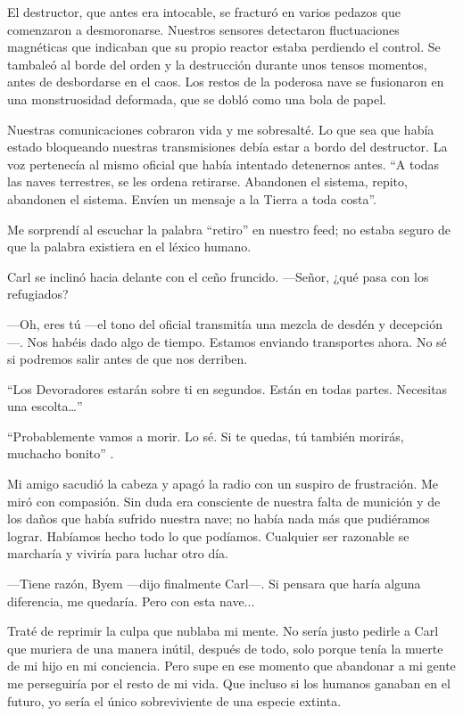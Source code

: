 El destructor, que antes era intocable, se fracturó en varios pedazos que comenzaron a desmoronarse. Nuestros sensores detectaron fluctuaciones magnéticas que indicaban que su propio reactor estaba perdiendo el control. Se tambaleó al borde del orden y la destrucción durante unos tensos momentos, antes de desbordarse en el caos. Los restos de la poderosa nave se fusionaron en una monstruosidad deformada, que se dobló como una bola de papel.

Nuestras comunicaciones cobraron vida y me sobresalté. Lo que sea que había estado bloqueando nuestras transmisiones debía estar a bordo del destructor. La voz pertenecía al mismo oficial que había intentado detenernos antes. ``A todas las naves terrestres, se les ordena retirarse. Abandonen el sistema, repito, abandonen el sistema. Envíen un mensaje a la Tierra a toda costa''.

Me sorprendí al escuchar la palabra ``retiro''
 en nuestro feed; no estaba seguro de que la palabra existiera en el léxico humano.

Carl se inclinó hacia delante con el ceño fruncido. —Señor, ¿qué pasa con los refugiados?

—Oh, eres tú —el tono del oficial transmitía una mezcla de desdén y decepción—. Nos habéis dado algo de tiempo. Estamos enviando transportes ahora. No sé si podremos salir antes de que nos derriben.

``Los Devoradores estarán sobre ti en segundos. Están en todas partes. Necesitas una escolta…''


``Probablemente vamos a morir. Lo sé. Si te quedas, tú también morirás, muchacho bonito''
.

Mi amigo sacudió la cabeza y apagó la radio con un suspiro de frustración. Me miró con compasión. Sin duda era consciente de nuestra falta de munición y de los daños que había sufrido nuestra nave; no había nada más que pudiéramos lograr. Habíamos hecho todo lo que podíamos. Cualquier ser razonable se marcharía y viviría para luchar otro día.

—Tiene razón, Byem —dijo finalmente Carl—. Si pensara que haría alguna diferencia, me quedaría. Pero con esta nave...

Traté de reprimir la culpa que nublaba mi mente. No sería justo pedirle a Carl que muriera de una manera inútil, después de todo, solo porque tenía la muerte de mi hijo en mi conciencia. Pero supe en ese momento que abandonar a mi gente me perseguiría por el resto de mi vida. Que incluso si los humanos ganaban en el futuro, yo sería el único sobreviviente de una especie extinta.

